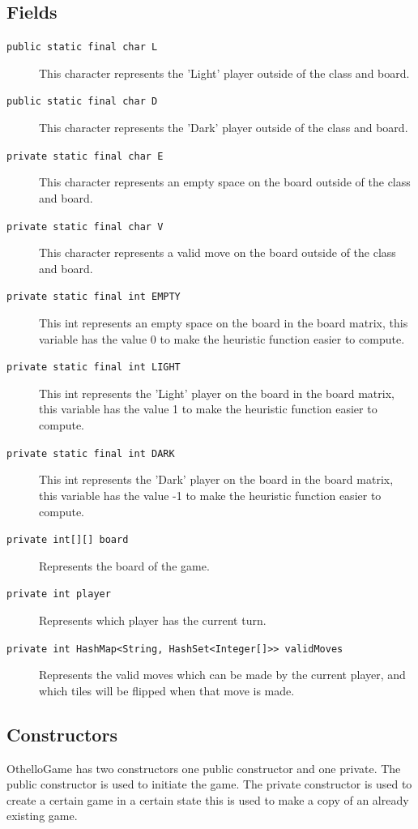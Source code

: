 \documentclass[a4paper]{article}
\begin{document}
\subsection{Fields}
\begin{description}
\item[\texttt{public static final char L}] This character represents the 'Light' player outside of the class and board.
\item[\texttt{public static final char D}] This character represents the 'Dark' player outside of the class and board.
\item[\texttt{private static final char E}] This character represents an empty space on the board outside of the class and board.
\item[\texttt{private static final char V}] This character represents a valid move on the board outside of the class and board.
\item[\texttt{private static final int EMPTY}] This int represents an empty space on the board in the board matrix, this variable has the value 0 to make the heuristic function easier to compute. 
\item[\texttt{private static final int LIGHT}] This int represents the 'Light' player on the board in the board matrix, this variable has the value 1 to make the heuristic function easier to compute. 
\item[\texttt{private static final int DARK}] This int represents the 'Dark' player on the board in the board matrix, this variable has the value -1 to make the heuristic function easier to compute. 
\item[\texttt{private int[][] board}] Represents the board of the game.
\item[\texttt{private int player}] Represents which player has the current turn.
\item[\texttt{private int HashMap<String, HashSet<Integer[]>> validMoves}] Represents the valid moves which can be made by the current player, and which tiles will be flipped when that move is made.
\end{description} 
\subsection{Constructors}
OthelloGame has two constructors one public constructor and one private. The public constructor is used to initiate the game. The private constructor is used to create a certain game in a certain state this is used to make a copy of an already existing game.
\end{document}
